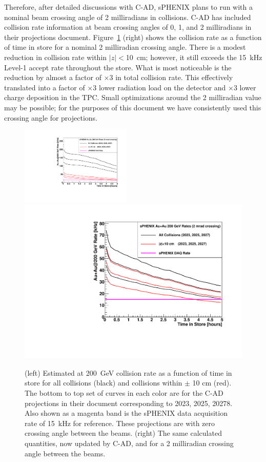 Therefore, after detailed discussions with C-AD, sPHENIX plans to run with a nominal beam crossing angle of 2 milliradians in \auau collisions.    C-AD has included collision rate information at beam crossing angles of 0, 1, and 2 milliradians in their projections document.    Figure~\ref{fig:auaulumcurves} (right) shows the collision rate as a function of time in store for a nominal 2 milliradian crossing angle.   There is a modest reduction in collision rate within $|z|<$10~cm; however, it still exceeds the 15~kHz Level-1 accept rate throughout the store.   What is most noticeable is the reduction by almost a factor of $\times$3 in total collision rate.   This effectively translated into a factor of $\times$3 lower radiation load on the detector and $\times$3 lower charge deposition in the TPC.   Small optimizations around the 2 milliradian value may be possible; for the purposes of this document we have consistently used this crossing angle for \auau projections.

\begin{figure}
\centering
\includegraphics[width=0.47\textwidth]{figs/figure_auauratestore_0mrad.pdf}
\includegraphics[width=0.47\linewidth]{figs/figure_auauratestore_2mrad.pdf}
\caption{(left) Estimated \auau at 200~GeV collision rate as a function of time in store for all collisions (black) and collisions within $\pm$ 10 cm (red).   The bottom to top set of curves in each color are for the C-AD projections in their document corresponding to 2023, 2025, 20278.
Also shown as a magenta band is the sPHENIX data acquisition rate of 15~kHz for reference.
These projections are with zero crossing angle between the beams. 
(right)
The same calculated quantities, now updated by C-AD, and for a 2 milliradian crossing angle between the beams.
\label{fig:auaulumcurves}}
\end{figure}

